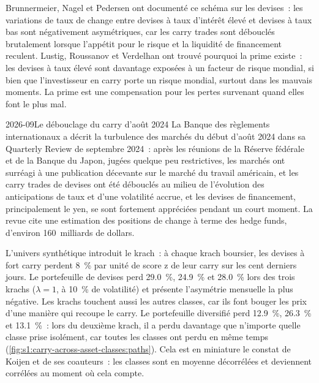 Brunnermeier, Nagel et Pedersen ont documenté ce schéma sur les devises~: les variations de taux de change entre devises à taux d'intérêt élevé et devises à taux bas sont négativement
asymétriques, car les carry trades sont débouclés brutalement lorsque l'appétit pour le risque et la liquidité de financement reculent. Lustig, Roussanov et Verdelhan ont trouvé pourquoi la prime
existe~: les devises à taux élevé sont davantage exposées à un facteur de risque mondial, si bien que l'investisseur en carry porte un risque mondial, surtout dans les mauvais moments. La prime est
une compensation pour les pertes survenant quand elles font le plus mal.

\begin{dated}{2026-09}{Le débouclage du carry d'août 2024}\label{dat:s1:carry-across-asset-classes:yen}
La Banque des règlements internationaux a décrit la turbulence des marchés du début d'août 2024 dans sa Quarterly Review de septembre 2024~: après les réunions de la Réserve
fédérale et de la Banque du Japon, jugées quelque peu restrictives, les marchés ont surréagi à une publication décevante sur le marché du travail américain, et les carry trades de devises
ont été débouclés au milieu de l'évolution des anticipations de taux et d'une volatilité accrue, et les devises de financement, principalement le yen, se sont fortement appréciées pendant un court moment.
La revue cite une estimation des positions de change à terme des hedge funds, d'environ 160~milliards de dollars.
\end{dated}

L'univers synthétique introduit le krach~: à chaque krach boursier, les devises à fort carry perdent 8~\% par unité de score z de leur carry sur les cent derniers jours.
Le portefeuille de devises perd 29.0~\%, 24.9~\% et 28.0~\% lors des trois krachs ($\lambda = 1$, à 10~\% de volatilité) et présente l'asymétrie mensuelle la plus négative.
Les krachs touchent aussi les autres classes, car ils font bouger les prix d'une manière qui recoupe le carry. Le portefeuille diversifié perd 12.9~\%, 26.3~\% et
13.1~\%~: lors du deuxième krach, il a perdu davantage que n'importe quelle classe prise isolément, car toutes les classes ont perdu en même temps (\cref{fig:s1:carry-across-asset-classes:paths}). Cela
est en miniature le constat de Koijen et de ses coauteurs~: les classes sont en moyenne décorrélées et deviennent corrélées au moment où cela compte.

